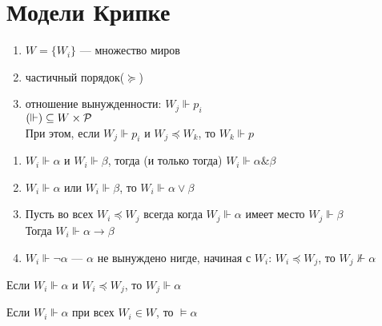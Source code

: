 \documentclass[oneside]{book}
\begin{document}
\section{Модели Крипке}
\label{sec:org2f420fa}
\begin{center}
\end{center}
\begin{defintion}
	\-
	\begin{enumerate}
		\item \(W = \{W_i\}\) --- множество миров
		\item частичный порядок(\(\succeq\))
		\item отношение вынужденности: \(W_j \Vdash p_i\) \\
		      \((\Vdash)  \subseteq W \times \P\) \\
		      При этом, если \(W_j \Vdash p_i\) и \(W_j \preceq W_k\), то \(W_k \Vdash p\)
	\end{enumerate}
	\label{orgf3424de}
\end{defintion}
\begin{definition}
	\-
	\begin{enumerate}
		\item \(W_i \Vdash \alpha\) и \(W_i \Vdash \beta\), тогда (и только тогда) \(W_i \Vdash \alpha \& \beta\) \\
		\item \(W_i \Vdash \alpha\) или \(W_i \Vdash \beta\), то \(W_i \Vdash \alpha \vee \beta\)
		\item Пусть во всех \(W_i \preceq W_j\) всегда когда \(W_j \Vdash \alpha\) имеет место \(W_j \Vdash \beta\) \\
		      Тогда \(W_i \Vdash \alpha \to \beta\)
		\item \(W_i \Vdash \neg \alpha\) --- \(\alpha\) не вынуждено нигде, начиная с \(W_i\):
		      \(W_i \preceq W_j\), то \(W_j \not\Vdash \alpha\)
	\end{enumerate}
	\label{org267cbe5}
\end{definition}
\begin{theorem}
	Если \(W_i \Vdash \alpha\) и \(W_i \preceq W_j\), то \(W_j \Vdash \alpha\)
	\label{org34f7ef6}
\end{theorem}
\begin{definition}
	Если \(W_i \Vdash \alpha\) при всех \(W_i \in W\), то \(\vDash \alpha\)
	\label{org2014505}
\end{definition}
\end{document}
